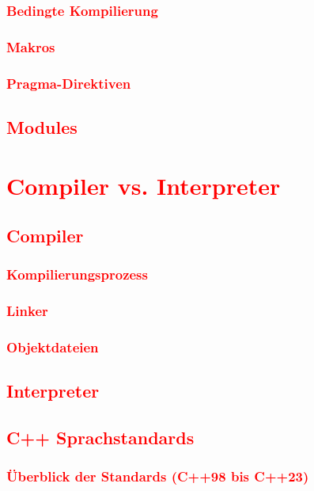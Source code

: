 \subsection{\textcolor{red}{Bedingte Kompilierung}}\label{sec:conditional-compilation}
\subsection{\textcolor{red}{Makros}}\label{sec:macros}
\subsection{\textcolor{red}{Pragma-Direktiven}}\label{sec:pragma}
\section{\textcolor{red}{Modules}}\label{sec:modules}

\cleardoublepage\chapter{\textcolor{red}{Compiler vs. Interpreter}}\label{chap:compiler-vs-interpreter}
\section{\textcolor{red}{Compiler}}\label{sec:compiler}
\subsection{\textcolor{red}{Kompilierungsprozess}}\label{sec:compilation-process}
\subsection{\textcolor{red}{Linker}}\label{sec:linker}
\subsection{\textcolor{red}{Objektdateien}}\label{sec:object-files}
\section{\textcolor{red}{Interpreter}}\label{sec:interpreter}
\section{\textcolor{red}{C++ Sprachstandards}}\label{sec:cpp-standards}
\subsection{\textcolor{red}{Überblick der Standards (C++98 bis C++23)}}\label{sec:standards-overview}

